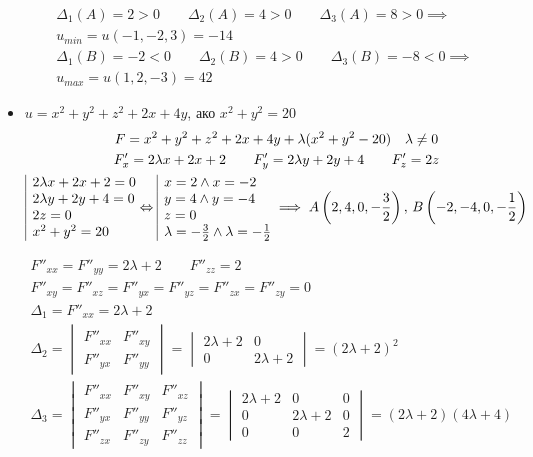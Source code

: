 \documentclass[a4paper,fleqn,12pt]{article}
\theoremstyle{definition}
\begin{document}
\begin{itemize}
\begin{gather*}
\Delta_1(A) = 2> 0 \qquad \Delta_2(A) = 4>0 \qquad \Delta_3(A) = 8 >0 \implies \\
u_{min} = u(-1,-2,3) = -14\\
\Delta_1(B) = -2 <0 \qquad \Delta_2(B) = 4>0 \qquad \Delta_3(B) = -8<0 \implies \\
u_{max} = u(1,2,-3) = 42
\end{gather*}

\item $u = x^2 + y^2 + z^2 + 2x + 4y $, ако $x^2 + y^2 = 20$
\begin{gather*}
F = x^2 + y^2 + z^2 + 2x + 4y + \lambda(x^2 + y^2 - 20)\quad \lambda \neq 0\\
F'_x = 2\lambda x + 2x + 2 \qquad F'_y = 2\lambda y + 2y + 4 \qquad F'_z =  2z \\
\begin{array}{|l@{}}
2\lambda x + 2x + 2 = 0 \\
2\lambda y + 2y + 4  = 0 \\
2z = 0 \\
x^2 + y^2= 20
\end{array}\Leftrightarrow 
\begin{array}{|l@{}}
x = 2 \land x = -2 \\
y = 4 \land y = -4 \\
z =0\\
\lambda = -\frac{3}{2} \land \lambda = -\frac{1}{2} 
\end{array} \implies A \left(2,4,0, -\frac{3}{2} \right), \, B \left(-2,-4,0, -\frac{1}{2} \right) 
\end{gather*}

\begin{gather*}
F''_{xx} = F''_{yy} = 2\lambda + 2 \qquad F''_{zz} = 2 \\
F''_{xy} = F''_{xz} = F''_{yx} = F''_{yz} = F''_{zx} = F''_{zy} = 0 \\
\Delta_1 = F''_{xx} = 2\lambda + 2 \\
 \Delta_2 = \begin{vmatrix} F''_{xx} & F''_{xy} \\ F''_{yx} & F''_{yy} \end{vmatrix} = \begin{vmatrix} 2\lambda + 2 & 0 \\0 & 2\lambda + 2  \end{vmatrix} = (2\lambda + 2)^2\\
\Delta_3 = \begin{vmatrix} F''_{xx} & F''_{xy} & F''_{xz}\\ F''_{yx} & F''_{yy} & F''_{yz} \\ F''_{zx} & F''_{zy} & F''_{zz}\end{vmatrix} = \begin{vmatrix} 2\lambda + 2 & 0 & 0 \\ 0 & 2\lambda + 2 & 0 \\ 0 & 0 & 2 \end{vmatrix} = (2\lambda + 2)(4\lambda + 4) 
\end{gather*}


\end{itemize}
\end{document}
